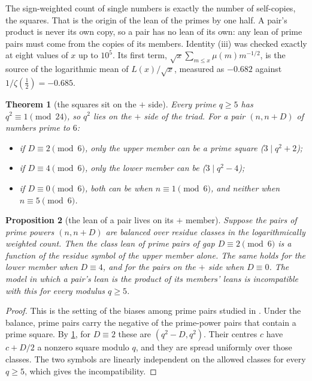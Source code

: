 \documentclass[11pt]{article}
\newtheorem{theorem}{Theorem}[section]
\newtheorem{proposition}[theorem]{Proposition}
\theoremstyle{definition}\newtheorem{definition}[theorem]{Definition}
\theoremstyle{remark}\newtheorem{remark}[theorem]{Remark}
\begin{document}
The sign-weighted count of single numbers is exactly the number of self-copies, the squares. That is the origin of the lean of the primes by one half. A pair's product is never its own copy, so a pair has no lean of its own: any lean of prime pairs must come from the copies of its members. Identity (iii) was checked exactly at eight values of $x$ up to $10^5$. Its first term, $\sqrt x\sum_{m\le x}\mu(m)m^{-1/2}$, is the source of the logarithmic mean of $L(x)/\sqrt x$, measured as $-0.682$ against $1/\zeta(\tfrac12)=-0.685$.

\begin{theorem}[the squares sit on the $+$ side]\label{thm:side}
Every prime $q\ge5$ has $q^2\equiv1\pmod{24}$, so $q^2$ lies on the $+$ side of the triad. For a pair $(n,n+D)$ of numbers prime to $6$:
\begin{itemize}
\item if $D\equiv2\pmod6$, only the upper member can be a prime square ($3\mid q^2+2$);
\item if $D\equiv4\pmod6$, only the lower member can be ($3\mid q^2-4$);
\item if $D\equiv0\pmod6$, both can be when $n\equiv1\pmod6$, and neither when $n\equiv5\pmod6$.
\end{itemize}
\end{theorem}

\begin{proposition}[the lean of a pair lives on its $+$ member]\label{prop:lean}
Suppose the pairs of prime powers $(n,n+D)$ are balanced over residue classes in the logarithmically weighted count. Then the class lean of prime pairs of gap $D\equiv2\pmod6$ is a function of the residue symbol of the upper member alone. The same holds for the lower member when $D\equiv4$, and for the pairs on the $+$ side when $D\equiv0$. The model in which a pair's lean is the product of its members' leans is incompatible with this for every modulus $q\ge5$.
\end{proposition}
\begin{proof}
This is the setting of the biases among prime pairs studied in \cite{LOS16}. Under the balance, prime pairs carry the negative of the prime-power pairs that contain a prime square. By \cref{thm:side}, for $D\equiv2$ these are $(q^2-D,q^2)$. Their centres $c$ have $c+D/2$ a nonzero square modulo $q$, and they are spread uniformly over those classes. The two symbols are linearly independent on the allowed classes for every $q\ge5$, which gives the incompatibility.
\end{proof}
\end{document}
